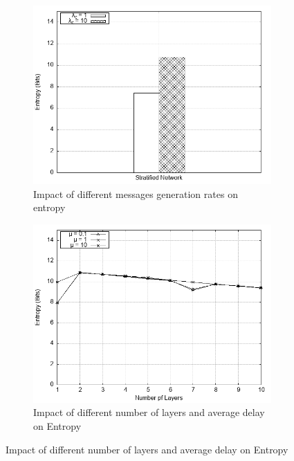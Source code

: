 \documentclass[logo,msc,cyber]{infthesis}   %
\begin{document}
\begin{figure}[h!]
    \centering
    \begin{subfigure}[b]{0.45\textwidth}
        \centering
        \includegraphics[width=\textwidth]{figures/mixim/2.png}
        \caption{Impact of different messages generation rates on entropy}
        \label{fig:mixim-different-generation}
    \end{subfigure}
    \hfill
    \begin{subfigure}[b]{0.45\textwidth}
        \centering
        \includegraphics[width=\textwidth]{figures/mixim/3.png}
        \caption{Impact of different number of layers and average delay on Entropy}
        \label{fig:mixim-different-layers}
    \end{subfigure}
 \end{figure}
\end{document}
